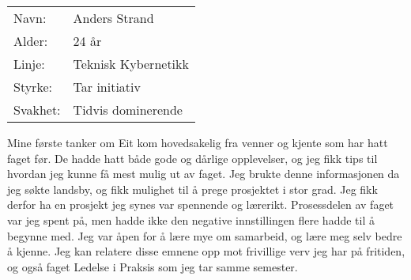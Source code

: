 \begin{table}[H]
\begin{tabular}{l l}
        Navn: & Anders Strand \\
        Alder: & 24 år \\ 
        Linje: & Teknisk Kybernetikk \\
        Styrke: & Tar initiativ \\
        Svakhet: & Tidvis dominerende
    \end{tabular}
\end{table}

Mine første tanker om Eit kom hovedsakelig fra venner og kjente som har hatt faget før.
De hadde hatt både gode og dårlige opplevelser, og jeg fikk tips til hvordan jeg kunne få mest mulig ut av faget. 
Jeg brukte denne informasjonen da jeg søkte landsby, og fikk mulighet til å prege prosjektet i stor grad. 
Jeg fikk derfor ha en prosjekt jeg synes var spennende og lærerikt.
Prosessdelen av faget var jeg spent på, men hadde ikke den negative innstillingen flere hadde til å begynne med. 
Jeg var åpen for å lære mye om samarbeid, og lære meg selv bedre å kjenne. 
Jeg kan relatere disse emnene opp mot frivillige verv jeg har på fritiden, og også faget Ledelse i Praksis som jeg tar samme semester.
